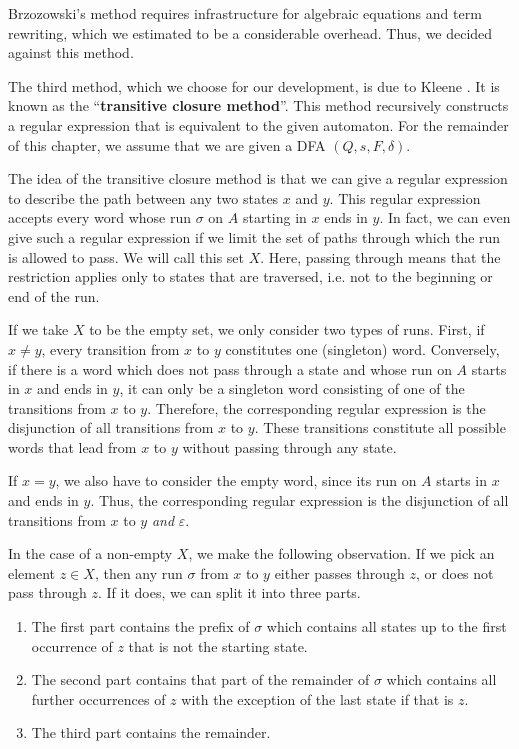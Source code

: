 Brzozowski's method requires infrastructure for algebraic equations and term rewriting, 
which we estimated to be a considerable overhead. Thus, we decided against this method.


The third method, which we choose for our development, is due to Kleene \cite{KleeneNets}.
It is known as the ``\textbf{transitive closure method}''.
This method recursively constructs a regular expression that is equivalent to the given automaton.
For the remainder of this chapter, we assume that we are given a DFA $(Q,s,F,\delta)$.


The idea of the transitive closure method is that we can give a regular expression to describe the path between any two states $x$ and $y$.
This regular expression accepts every word whose run $\sigma$ on $A$ starting in $x$ ends in $y$.
In fact, we can even give such a regular expression if we limit the set of paths through which the run is allowed to pass. 
We will call this set $X$.
Here, passing through means that the restriction applies only to states that are traversed, 
i.e. not to the beginning or end of the run.


If we take $X$ to be the empty set, we only consider two types of runs.
First, if $x \neq y$, every transition from $x$ to $y$ constitutes one (singleton) word. 
Conversely, if there is a word which does not pass through a state and whose run on $A$ starts in $x$ and ends in $y$, 
it can only be a singleton word consisting of one of the transitions from $x$ to $y$.
Therefore, the corresponding regular expression is the disjunction of all transitions from $x$ to $y$. 
These transitions constitute all possible words that lead from $x$ to $y$ without passing through any state.

If $x = y$, we also have to consider the empty word, since its run on $A$ starts in $x$ and ends in $y$.
Thus, the corresponding regular expression is the disjunction of all transitions from $x$ to $y$ \textit{and} $\varepsilon$.


In the case of a non-empty $X$, we make the following observation. 
If we pick an element $z \in X$, then any run $\sigma$ from $x$ to $y$ either passes through $z$, or does not pass through $z$.
If it does, we can split it into three parts.
\begin{enumerate}[label=(\roman*)]
    \item  \label{R_xz}
        The first part contains the prefix of $\sigma$ which contains all states up to the first occurrence of $z$ that is not the starting state.
    \item  \label{R_zz}
        The second part contains that part of the remainder of $\sigma$ which contains all further occurrences of $z$ with the exception of the last state if that is $z$.
    \item  \label{R_zy}
        The third part contains the remainder.
\end{enumerate}

